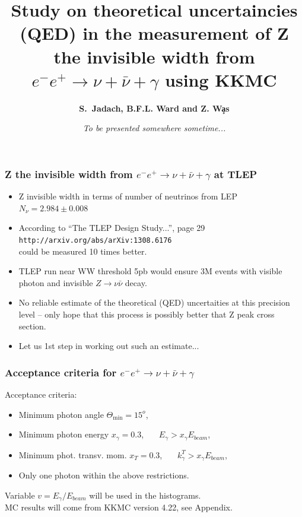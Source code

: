 \documentclass{beamer}
\title[Monte Carlo Methods] %
{ {\bf Study on theoretical uncertaincies (QED) in the measurement
  of Z the invisible width from 
  $e^-e^+\to\nu+\bar\nu+\gamma$ using KKMC}
} %
\author[S.~Jadach] %
{\bf S.~Jadach,  B.F.L. Ward and Z. W\c{a}s}
\institute[Universities of Somewhere and Elsewhere] %
{ {\large\crd IFJ-PAN, Krak\'ow, Poland}\\
  {~~~}\\
  {\footnotesize
  Partly supported by Polish Government grant\\
  {\em Narodowe Centrum Nauki} DEC-2011/03/B/ST2/02632
}}
\date[Short Occasion] %
{\em To be presented somewhere sometime...
}
\begin{document}
\begin{frame}
  \titlepage
\end{frame}

\begin{frame}[fragile]
\frametitle{\bf Z the invisible width from 
  $e^-e^+\to\nu+\bar\nu+\gamma$ at TLEP}
\small
\begin{itemize}
\item
Z invisible width in terms of number of neutrinos from LEP
$N_\nu = 2.984\pm0.008$
\item
According to ``The TLEP Design Study...'', page 29
{\tt http://arxiv.org/abs/arXiv:1308.6176}\\
could be measured 10 times better.
\item
TLEP run near WW threshold 5pb would ensure 3M events
with visible photon and invisible $Z\to \nu\bar\nu$ decay.
\item
No reliable estimate of the theoretical
(QED) uncertaities at this precision level --
only hope that this process is possibly 
better that Z peak cross section.
\item
Let us 1st step in working out such an estimate...
\end{itemize}
\end{frame}

\begin{frame}[fragile]
\frametitle{\bf Acceptance criteria for $e^-e^+\to\nu+\bar\nu+\gamma$}
Acceptance criteria:
\begin{itemize}
\item
Minimum photon angle $\Theta_{\min}=15^o$,
\item
Minimum photon energy $x_\gamma=0.3$, ~~~$E_\gamma > x_\gamma E_{beam}$,
\item
Minimum phot. transv. mom. $x_T=0.3$, ~~~$k^T_\gamma > x_\gamma E_{beam}$,
\item
Only one photon within the above restrictions.
\end{itemize}
Variable $v=E_\gamma/E_{beam}$ will be used in the histograms.\\
MC results will come from KKMC version 4.22, see Appendix.

\end{frame}
\end{document}
